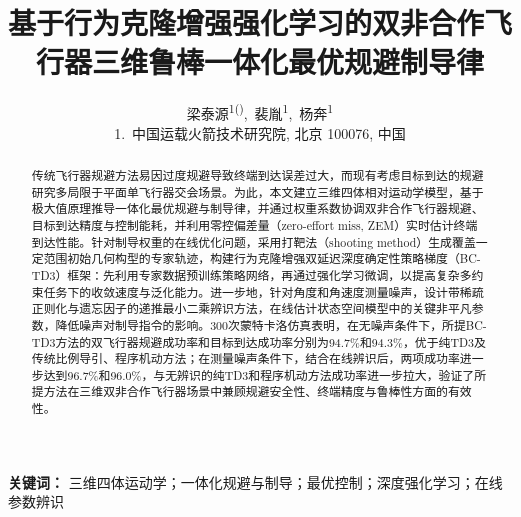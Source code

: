 

\title{基于行为克隆增强强化学习的双非合作飞行器三维鲁棒一体化最优规避制导律}
\author{%
梁泰源\textsuperscript{1()},~裴胤\textsuperscript{1},~杨奔\textsuperscript{1}\\[0.6em]
{\normalsize 1.~中国运载火箭技术研究院, 北京 100076, 中国}%
}
\date{}


\maketitle

\begin{abstract}
传统飞行器规避方法易因过度规避导致终端到达误差过大，而现有考虑目标到达的规避研究多局限于平面单飞行器交会场景。为此，本文建立三维四体相对运动学模型，基于极大值原理推导一体化最优规避与制导律，并通过权重系数协调双非合作飞行器规避、目标到达精度与控制能耗，并利用零控偏差量（zero-effort miss, ZEM）实时估计终端到达性能。针对制导权重的在线优化问题，采用打靶法（shooting method）生成覆盖一定范围初始几何构型的专家轨迹，构建行为克隆增强双延迟深度确定性策略梯度（BC-TD3）框架：先利用专家数据预训练策略网络，再通过强化学习微调，以提高复杂多约束任务下的收敛速度与泛化能力。进一步地，针对角度和角速度测量噪声，设计带稀疏正则化与遗忘因子的递推最小二乘辨识方法，在线估计状态空间模型中的关键非平凡参数，降低噪声对制导指令的影响。300次蒙特卡洛仿真表明，在无噪声条件下，所提BC-TD3方法的双飞行器规避成功率和目标到达成功率分别为94.7\%和94.3\%，优于纯TD3及传统比例导引、程序机动方法；在测量噪声条件下，结合在线辨识后，两项成功率进一步达到96.7\%和96.0\%，与无辨识的纯TD3和程序机动方法成功率进一步拉大，验证了所提方法在三维双非合作飞行器场景中兼顾规避安全性、终端精度与鲁棒性方面的有效性。
\end{abstract}

\noindent\textbf{关键词：} 三维四体运动学；一体化规避与制导；最优控制；深度强化学习；在线参数辨识









\printbibliography[title={参考文献}]

